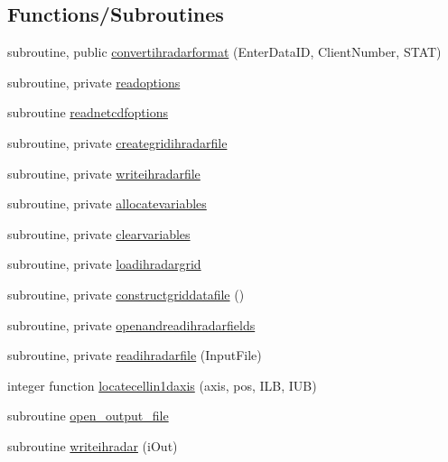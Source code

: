\subsection*{Functions/\+Subroutines}
\begin{DoxyCompactItemize}
\item 
subroutine, public \mbox{\hyperlink{namespacemoduleihradarformat_a98ed94c78a186e13367d60ca010104fb}{convertihradarformat}} (Enter\+Data\+ID, Client\+Number, S\+T\+AT)
\item 
subroutine, private \mbox{\hyperlink{namespacemoduleihradarformat_aee7099f1405740714bd8905f16b2c9bf}{readoptions}}
\item 
subroutine \mbox{\hyperlink{namespacemoduleihradarformat_a11ef1762e3ede5825ed4cfa4192378d3}{readnetcdfoptions}}
\item 
subroutine, private \mbox{\hyperlink{namespacemoduleihradarformat_ada390827dfd90ffece67dfc0ddc1a1af}{creategridihradarfile}}
\item 
subroutine, private \mbox{\hyperlink{namespacemoduleihradarformat_a159e87b28314bc4e1c2d025679d954ff}{writeihradarfile}}
\item 
subroutine, private \mbox{\hyperlink{namespacemoduleihradarformat_a5e6d5ce963365079322d81b8c5030265}{allocatevariables}}
\item 
subroutine, private \mbox{\hyperlink{namespacemoduleihradarformat_a1116a7a33c3cd3f0002a36a069bd6df9}{clearvariables}}
\item 
subroutine, private \mbox{\hyperlink{namespacemoduleihradarformat_a3b96dd949bf780f8b1d2d5d3818dda48}{loadihradargrid}}
\item 
subroutine, private \mbox{\hyperlink{namespacemoduleihradarformat_a02661cf4395883e003f6785721da99e9}{constructgriddatafile}} ()
\item 
subroutine, private \mbox{\hyperlink{namespacemoduleihradarformat_a1ddc10c28e0f93952a3e8c21ab4b9e37}{openandreadihradarfields}}
\item 
subroutine, private \mbox{\hyperlink{namespacemoduleihradarformat_adb71a6554853412cfc2f930bf2a31f3a}{readihradarfile}} (Input\+File)
\item 
integer function \mbox{\hyperlink{namespacemoduleihradarformat_a940aa69f596041c70dab62721c97072f}{locatecellin1daxis}} (axis, pos, I\+LB, I\+UB)
\item 
subroutine \mbox{\hyperlink{namespacemoduleihradarformat_a1fa82a4000e864d7a0c4a4e1759efac9}{open\+\_\+output\+\_\+file}}
\item 
subroutine \mbox{\hyperlink{namespacemoduleihradarformat_a6051373784b4b3c69f611fa904fbad43}{writeihradar}} (i\+Out)

\end{DoxyCompactItemize}
